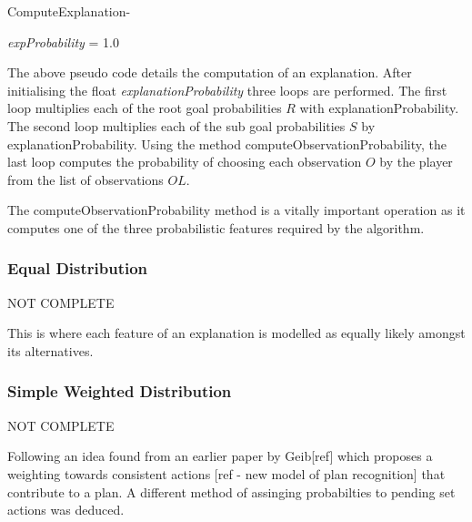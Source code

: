 \documentclass[parskip]{cs4rep}
\begin{document}
\begin{pseudocode}{ComputeExplanation}{-}
\begin{algorithm}[H]

\textit{expProbability} = 1.0




\end{algorithm}
\end{pseudocode}

The above pseudo code details the computation of an explanation. After initialising the float \textit{explanationProbability} three loops are performed. The first loop multiplies each of the root goal probabilities $R$ with explanationProbability. The second loop multiplies each of the sub goal probabilities $S$ by explanationProbability. Using the method computeObservationProbability, the last loop computes the probability of choosing each observation $O$ by the player from the list of observations $OL$.

The computeObservationProbability method is a vitally important operation as it computes one of the three probabilistic features required by the algorithm.

\subsubsection{Equal Distribution}

NOT COMPLETE

This is where each feature of an explanation is modelled as equally likely amongst its alternatives. 

\subsubsection{Simple Weighted Distribution}

NOT COMPLETE

Following an idea found from an earlier paper by Geib[ref] which proposes a weighting towards consistent actions [ref - new model of plan recognition] that contribute to a plan. A different method of assinging probabilties to pending set actions was deduced.
\end{document}
